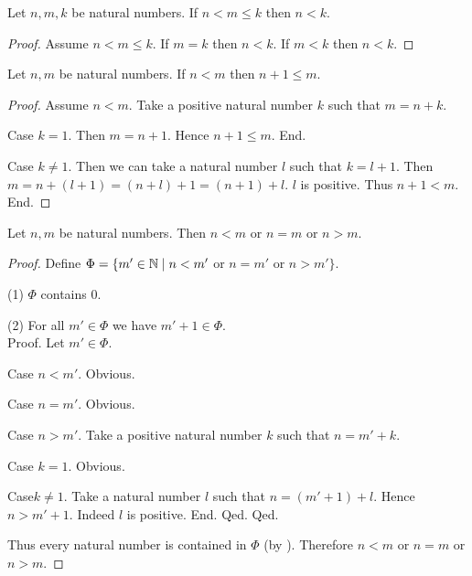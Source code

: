 \documentclass[10pt]{article}
\begin{document}
  \begin{forthel}
    \begin{proposition}[id=ARITHMETIC_04_4809599527944192,printid]
      Let $n, m, k$ be natural numbers.
      If $n < m \leq k$ then $n < k$.
    \end{proposition}
    \begin{proof}
      Assume $n < m \leq k$.
      If $m = k$ then $n < k$.
      If $m < k$ then $n < k$.
    \end{proof}
  \end{forthel}

  \begin{forthel}
    \begin{proposition}[id=ARITHMETIC_04_8584998051381248,printid]
      Let $n, m$ be natural numbers.
      If $n < m$ then $n + 1 \leq m$.
    \end{proposition}
    \begin{proof}
      Assume $n < m$.
      Take a positive natural number $k$ such that $m = n + k$.

      Case $k = 1$.
        Then $m = n + 1$.
        Hence $n + 1 \leq m$.
      End.

      Case $k \neq 1$.
        Then we can take a natural number $l$ such that $k = l + 1$.
        Then $m
          = n + (l + 1)
          = (n + l) + 1
          = (n + 1) + l$.
        $l$ is positive.
        Thus $n + 1 < m$.
      End.
    \end{proof}
  \end{forthel}

  \begin{forthel}
    \begin{proposition}[id=ARITHMETIC_04_8201937860165632,printid]
      Let $n, m$ be natural numbers.
      Then $n < m$ or $n = m$ or $n > m$.
    \end{proposition}
    \begin{proof}
      Define $\Phi = \{ m' \in \mathbb{N} \mid n < m'$ or $n = m'$ or $n > m' \}$.

      (1) $\Phi$ contains $0$.

      (2) For all $m' \in \Phi$ we have $m' + 1 \in \Phi$. \\
      Proof.
        Let $m' \in \Phi$.

        Case $n < m'$. Obvious.

        Case $n = m'$. Obvious.

        Case $n > m'$.
          Take a positive natural number $k$ such that $n = m' + k$.

          Case $k = 1$. Obvious.

          Case$k \neq 1$.
            Take a natural number $l$ such that $n = (m' + 1) + l$.
            Hence $n > m' + 1$.
            Indeed $l$ is positive.
          End.
        Qed.
      Qed.

      Thus every natural number is contained in $\Phi$ (by ).
      Therefore $n < m$ or $n = m$ or $n > m$.
    \end{proof}
  \end{forthel}
\end{document}
